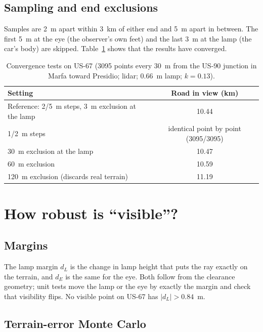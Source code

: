 \documentclass[11pt]{article}
\begin{document}
\subsection{Sampling and end exclusions}

Samples are 2~m apart within 3~km of either end and 5~m apart in between. The first 5~m at the eye (the observer's own feet) and the last 3~m at the lamp (the car's body) are skipped. Table~\ref{t:conv} shows that the results have converged.

\begin{table}[htbp]
\caption{Convergence tests on US-67 (3095 points every 30~m from the US-90 junction in Marfa toward Presidio; lidar; 0.66~m lamp; $k=0.13$).}
\label{t:conv}
\small
\begin{tabular}{lc}
\toprule
Setting & Road in view (km) \\
\midrule
Reference: 2/5~m steps, 3~m exclusion at the lamp & 10.44\\
1/2~m steps & identical point by point (3095/3095)\\
30~m exclusion at the lamp & 10.47\\
60~m exclusion & 10.59\\
120~m exclusion (discards real terrain) & 11.19\\
\bottomrule
\end{tabular}
\end{table}

\section{How robust is ``visible''?}\label{s:robust}

\subsection{Margins}

The lamp margin $d_L$ is the change in lamp height that puts the ray exactly on the terrain, and $d_E$ is the same for the eye. Both follow from the clearance geometry; unit tests move the lamp or the eye by exactly the margin and check that visibility flips. No visible point on US-67 has $|d_L|>0.84$~m.

\subsection{Terrain-error Monte Carlo}
\end{document}
